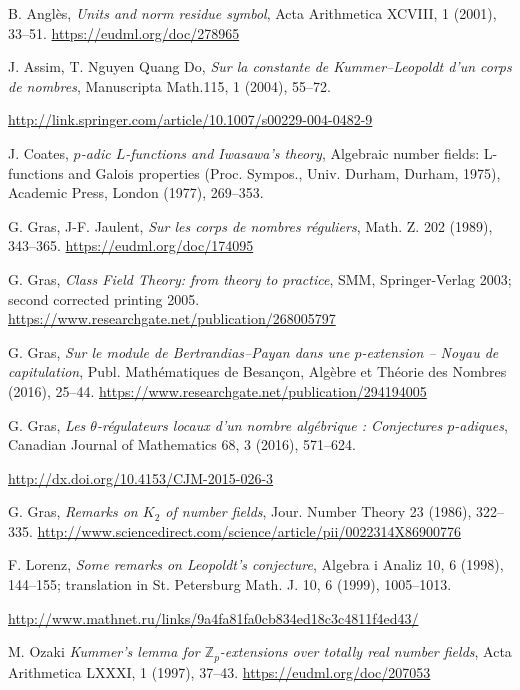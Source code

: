 \documentclass[12pt]{amsart}
\theoremstyle{definition}
\numberwithin{equation}{section}
\begin{document}
\begin{thebibliography}{HD}

 B. Angl\`es,  {\it Units and norm residue symbol}, Acta Arithmetica XCVIII, 1 (2001), 33--51.
\url{https://eudml.org/doc/278965}

 J. Assim, T. Nguyen Quang Do, {\it Sur la constante de 
Kummer--Leopoldt d'un corps de nombres}, Manuscripta Math.115, 1 (2004), 55--72.

\url{http://link.springer.com/article/10.1007/s00229-004-0482-9}

 J. Coates, {\it $p$-adic $L$-functions and Iwasawa's theory}, 
 Algebraic number fields: L-functions and Galois properties
 (Proc. Sympos., Univ. Durham, Durham, 1975),  Academic Press, London (1977), 269--353. 

 G. Gras, J-F. Jaulent,  {\it Sur les corps de nombres r\'eguliers}, Math. Z.
202 (1989), 343--365. \url{https://eudml.org/doc/174095}

 G. Gras, {\it Class Field Theory: from theory to practice},
SMM, Springer-Verlag 2003;  second corrected printing 2005.
\url{https://www.researchgate.net/publication/268005797}

  G. Gras, {\it Sur le module de Bertrandias--Payan dans une $p$-extension -- 
Noyau de capitulation}, Publ. Math\'ematiques de Besan\c con,
Alg\`ebre et Th\'eorie des Nombres (2016), 25--44. 
\url{https://www.researchgate.net/publication/294194005}

 G. Gras, {\it Les $\theta$-r\'egulateurs locaux d'un nombre alg\'ebrique :
Conjectures $p$-adiques}, Canadian Journal of Mathematics 68, 3 (2016), 571--624. 

\url{http://dx.doi.org/10.4153/CJM-2015-026-3}

 G. Gras, {\it  Remarks on $K_2$ of number fields}, Jour. Number Theory 23
(1986), 322--335.
\url{http://www.sciencedirect.com/science/article/pii/0022314X86900776}

 F. Lorenz,  {\it Some remarks on Leopoldt's conjecture}, Algebra i Analiz 10, 6 
(1998), 144--155; translation in St. Petersburg Math. J. 10, 6 (1999), 1005--1013.

\url{http://www.mathnet.ru/links/9a4fa81fa0cb834ed18c3c4811f4ed43/}

 M. Ozaki {\it Kummer's lemma for ${\mathbb{Z}}_p$-extensions over totally real number fields},
Acta Arithmetica LXXXI, 1 (1997), 37--43. \url{https://eudml.org/doc/207053}


\end{thebibliography}
\end{document}
